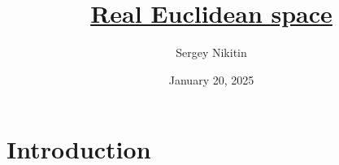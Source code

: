 \documentclass[color=black,11pt]{elegantpaper}
\title{\href{https://en.wikipedia.org/wiki/Euclidean_space}{Real Euclidean space}}
\author{Sergey Nikitin}
\date{January 20, 2025}
\begin{document}
\maketitle



\section*{Introduction}


 
\end{document}
